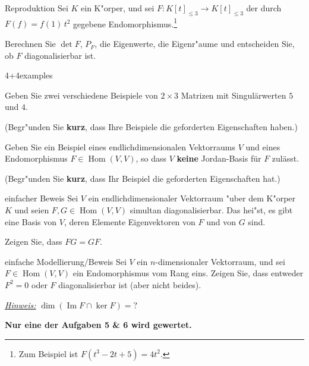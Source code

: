 \documentclass[a4paper]{article}
\DeclareMathOperator{\Hom}{Hom}
\DeclareMathOperator{\im}{Im}
\begin{document}

\begin{klaufg}{8}{Reproduktion}
  Sei $K$ ein K"orper, und sei $F \colon K[t]_{\le3} \to K[t]_{\le3}$
  der durch $F(f) = f(1)\,t^2$ gegebene Endomorphismus.\footnote{Zum
    Beispiel ist $F(t^3-2t+5) = 4t^2$.}

  Berechnen Sie $\det F$, $P_F$, die Eigenwerte, die Eigenr"aume und entscheiden Sie, ob
  $F$ diagonalisierbar ist.
  \vfill \mbox{}
  \end{klaufg}

\pagebreak
\begin{klaufg}{4+4}{examples}

  Geben Sie zwei verschiedene Beispiele von $2 \times 3$ Matrizen mit
  Singulärwerten $5$ und $4$.

  (Begr"unden Sie {\bfseries\sffamily kurz}, dass Ihre Beispiele die
  geforderten Eigenschaften haben.)
  \pagebreak
  
  Geben Sie ein Beispiel eines endlichdimensionalen Vektorraums $V$
  und eines Endomorphismus $F \in \Hom(V,V)$, so dass $V$
    {\bfseries keine} Jordan-Basis für $F$ zulässt.
  
  (Begr"unden Sie {\bfseries\sffamily kurz}, dass Ihr Beispiel die
  geforderten Eigenschaften hat.)

\end{klaufg}

\pagebreak
\begin{klaufg}{8}{einfacher Beweis}
  Sei $V$ ein endlichdimensionaler Vektorraum "uber dem K"orper $K$
  und seien $F,G \in \Hom(V,V)$ simultan diagonalisierbar. Das hei"st,
  es gibt eine Basis von $V$, deren Elemente Eigenvektoren von $F$ und
  von $G$ sind.

  Zeigen Sie, dass $FG=GF$.
\end{klaufg}

\pagebreak
\begin{klaufg}{8}{einfache Modellierung/Beweis}
  Sei $V$ ein $n$-dimensionaler Vektorraum, und sei $F \in \Hom(V,V)$
  ein Endomorphismus vom Rang eins.
  Zeigen Sie, dass entweder $F^2=0$ oder $F$ diagonalisierbar ist
  (aber nicht beides).

  \underline{\emph{Hinweis:}} $\dim(\im F \cap \ker F) = ?$
\end{klaufg}

\pagebreak
{\bfseries Nur eine der Aufgaben 5 \& 6 wird gewertet.}
\bigskip
\bigskip
\end{document}
